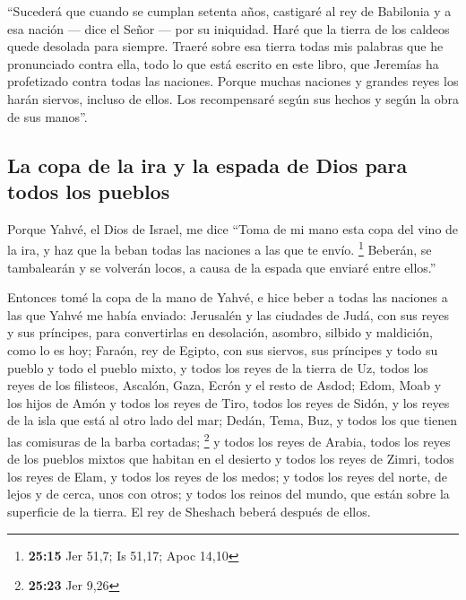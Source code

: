  ``Sucederá que cuando se cumplan setenta años, castigaré
al rey de Babilonia y a esa nación --- dice el Señor --- por su
iniquidad. Haré que la tierra de los caldeos quede desolada para
siempre.  Traeré sobre esa tierra todas mis palabras que
he pronunciado contra ella, todo lo que está escrito en este libro, que
Jeremías ha profetizado contra todas las naciones. 
Porque muchas naciones y grandes reyes los harán siervos, incluso de
ellos. Los recompensaré según sus hechos y según la obra de sus manos''.

\hypertarget{la-copa-de-la-ira-y-la-espada-de-dios-para-todos-los-pueblos}{%
\subsection{La copa de la ira y la espada de Dios para todos los
pueblos}\label{la-copa-de-la-ira-y-la-espada-de-dios-para-todos-los-pueblos}}

 Porque Yahvé, el Dios de Israel, me dice ``Toma de mi
mano esta copa del vino de la ira, y haz que la beban todas las naciones
a las que te envío. \footnote{\textbf{25:15} Jer 51,7; Is 51,17; Apoc
  14,10}  Beberán, se tambalearán y se volverán locos, a
causa de la espada que enviaré entre ellos.''

 Entonces tomé la copa de la mano de Yahvé, e hice beber
a todas las naciones a las que Yahvé me había enviado: 
Jerusalén y las ciudades de Judá, con sus reyes y sus príncipes, para
convertirlas en desolación, asombro, silbido y maldición, como lo es
hoy;  Faraón, rey de Egipto, con sus siervos, sus
príncipes y todo su pueblo  y todo el pueblo mixto, y
todos los reyes de la tierra de Uz, todos los reyes de los filisteos,
Ascalón, Gaza, Ecrón y el resto de Asdod;  Edom, Moab y
los hijos de Amón  y todos los reyes de Tiro, todos los
reyes de Sidón, y los reyes de la isla que está al otro lado del mar;
 Dedán, Tema, Buz, y todos los que tienen las comisuras
de la barba cortadas; \footnote{\textbf{25:23} Jer 9,26} 
y todos los reyes de Arabia, todos los reyes de los pueblos mixtos que
habitan en el desierto  y todos los reyes de Zimri, todos
los reyes de Elam, y todos los reyes de los medos;  y
todos los reyes del norte, de lejos y de cerca, unos con otros; y todos
los reinos del mundo, que están sobre la superficie de la tierra. El rey
de Sheshach beberá después de ellos.


